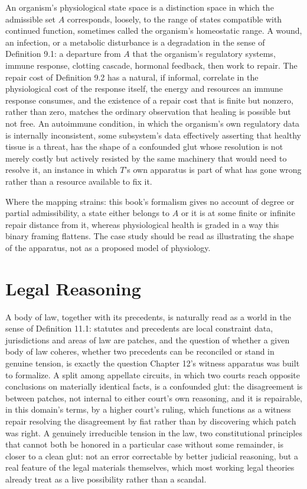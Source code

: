 \documentclass[11pt]{book}
\begin{document}
An organism's physiological state space is a distinction space in which the admissible set $A$ corresponds, loosely, to the range of states compatible with continued function, sometimes called the organism's homeostatic range. A wound, an infection, or a metabolic disturbance is a degradation in the sense of Definition 9.1: a departure from $A$ that the organism's regulatory systems, immune response, clotting cascade, hormonal feedback, then work to repair. The repair cost of Definition 9.2 has a natural, if informal, correlate in the physiological cost of the response itself, the energy and resources an immune response consumes, and the existence of a repair cost that is finite but nonzero, rather than zero, matches the ordinary observation that healing is possible but not free. An autoimmune condition, in which the organism's own regulatory data is internally inconsistent, some subsystem's data effectively asserting that healthy tissue is a threat, has the shape of a confounded glut whose resolution is not merely costly but actively resisted by the same machinery that would need to resolve it, an instance in which $T$'s own apparatus is part of what has gone wrong rather than a resource available to fix it.

Where the mapping strains: this book's formalism gives no account of degree or partial admissibility, a state either belongs to $A$ or it is at some finite or infinite repair distance from it, whereas physiological health is graded in a way this binary framing flattens. The case study should be read as illustrating the shape of the apparatus, not as a proposed model of physiology.

\section*{Legal Reasoning}

A body of law, together with its precedents, is naturally read as a world in the sense of Definition 11.1: statutes and precedents are local constraint data, jurisdictions and areas of law are patches, and the question of whether a given body of law coheres, whether two precedents can be reconciled or stand in genuine tension, is exactly the question Chapter 12's witness apparatus was built to formalize. A split among appellate circuits, in which two courts reach opposite conclusions on materially identical facts, is a confounded glut: the disagreement is between patches, not internal to either court's own reasoning, and it is repairable, in this domain's terms, by a higher court's ruling, which functions as a witness repair resolving the disagreement by fiat rather than by discovering which patch was right. A genuinely irreducible tension in the law, two constitutional principles that cannot both be honored in a particular case without some remainder, is closer to a clean glut: not an error correctable by better judicial reasoning, but a real feature of the legal materials themselves, which most working legal theories already treat as a live possibility rather than a scandal.
\end{document}
